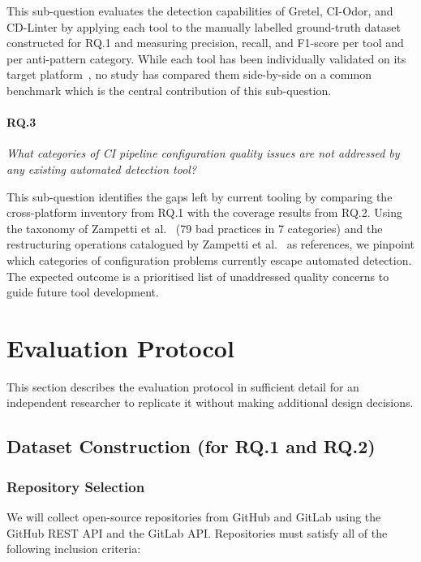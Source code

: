 \documentclass[12pt, a4paper]{article}
\begin{document}
This sub-question evaluates the detection capabilities of Gretel, CI-Odor, and
CD-Linter by applying each tool to the manually labelled ground-truth dataset
constructed for RQ.1 and measuring precision, recall, and F1-score per tool and per
anti-pattern category. While each tool has been individually validated on its target
platform~\cite{gallaba2020, vassallo2019, vassallo2020b}, no study has compared them
side-by-side on a common benchmark which is the central contribution of this
sub-question.

\paragraph{RQ.3}
\textit{What categories of CI pipeline configuration quality issues are not addressed
by any existing automated detection tool?}

This sub-question identifies the gaps left by current tooling by comparing the
cross-platform inventory from RQ.1 with the coverage results from RQ.2. Using the
taxonomy of Zampetti et al.~\cite{zampetti2020} (79 bad practices in 7 categories)
and the restructuring operations catalogued by Zampetti et al.~\cite{zampetti2021}
as references, we pinpoint which categories of configuration problems currently escape
automated detection. The expected outcome is a prioritised list of unaddressed quality
concerns to guide future tool development.

\section{Evaluation Protocol}

This section describes the evaluation protocol in sufficient detail for an independent
researcher to replicate it without making additional design decisions.

\subsection{Dataset Construction (for RQ.1 and RQ.2)}

\subsubsection{Repository Selection}

We will collect open-source repositories from GitHub and GitLab using the GitHub REST
API and the GitLab API. Repositories must satisfy all of the following inclusion
criteria:
\end{document}
